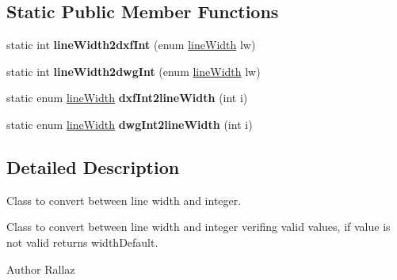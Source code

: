\subsection*{Static Public Member Functions}
\begin{DoxyCompactItemize}
\item 
\hypertarget{classDRW__LW__Conv_ae04db3ca893a97e52becb3c9e397bac7}{static int {\bfseries line\-Width2dxf\-Int} (enum \hyperlink{classDRW__LW__Conv_aed68cbc3d8bdf7e20003dd2d970279b3}{line\-Width} lw)}\label{classDRW__LW__Conv_ae04db3ca893a97e52becb3c9e397bac7}

\item 
\hypertarget{classDRW__LW__Conv_adba47fcde91b4ca2c0f4e0ddc68c36fe}{static int {\bfseries line\-Width2dwg\-Int} (enum \hyperlink{classDRW__LW__Conv_aed68cbc3d8bdf7e20003dd2d970279b3}{line\-Width} lw)}\label{classDRW__LW__Conv_adba47fcde91b4ca2c0f4e0ddc68c36fe}

\item 
\hypertarget{classDRW__LW__Conv_a0e90e21739f2632c261a2e6f74a7d77f}{static enum \hyperlink{classDRW__LW__Conv_aed68cbc3d8bdf7e20003dd2d970279b3}{line\-Width} {\bfseries dxf\-Int2line\-Width} (int i)}\label{classDRW__LW__Conv_a0e90e21739f2632c261a2e6f74a7d77f}

\item 
\hypertarget{classDRW__LW__Conv_a6f785a6b2ebd2674199b555aed0d6631}{static enum \hyperlink{classDRW__LW__Conv_aed68cbc3d8bdf7e20003dd2d970279b3}{line\-Width} {\bfseries dwg\-Int2line\-Width} (int i)}\label{classDRW__LW__Conv_a6f785a6b2ebd2674199b555aed0d6631}

\end{DoxyCompactItemize}


\subsection{Detailed Description}
Class to convert between line width and integer. 

Class to convert between line width and integer verifing valid values, if value is not valid returns width\-Default. \begin{DoxyAuthor}{Author}
Rallaz 
\end{DoxyAuthor}



